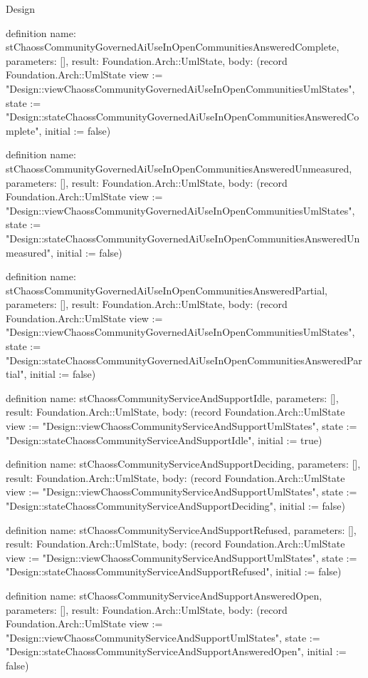 \begin{lexlean}{Design}
\begin{semanticmodule}
definition{
  name: stChaossCommunityGovernedAiUseInOpenCommunitiesAnsweredComplete,
  parameters: [],
  result: Foundation.Arch::UmlState,
  body: (record Foundation.Arch::UmlState {view := "Design::viewChaossCommunityGovernedAiUseInOpenCommunitiesUmlStates", state := "Design::stateChaossCommunityGovernedAiUseInOpenCommunitiesAnsweredComplete", initial := false})
}

definition{
  name: stChaossCommunityGovernedAiUseInOpenCommunitiesAnsweredUnmeasured,
  parameters: [],
  result: Foundation.Arch::UmlState,
  body: (record Foundation.Arch::UmlState {view := "Design::viewChaossCommunityGovernedAiUseInOpenCommunitiesUmlStates", state := "Design::stateChaossCommunityGovernedAiUseInOpenCommunitiesAnsweredUnmeasured", initial := false})
}

definition{
  name: stChaossCommunityGovernedAiUseInOpenCommunitiesAnsweredPartial,
  parameters: [],
  result: Foundation.Arch::UmlState,
  body: (record Foundation.Arch::UmlState {view := "Design::viewChaossCommunityGovernedAiUseInOpenCommunitiesUmlStates", state := "Design::stateChaossCommunityGovernedAiUseInOpenCommunitiesAnsweredPartial", initial := false})
}

definition{
  name: stChaossCommunityServiceAndSupportIdle,
  parameters: [],
  result: Foundation.Arch::UmlState,
  body: (record Foundation.Arch::UmlState {view := "Design::viewChaossCommunityServiceAndSupportUmlStates", state := "Design::stateChaossCommunityServiceAndSupportIdle", initial := true})
}

definition{
  name: stChaossCommunityServiceAndSupportDeciding,
  parameters: [],
  result: Foundation.Arch::UmlState,
  body: (record Foundation.Arch::UmlState {view := "Design::viewChaossCommunityServiceAndSupportUmlStates", state := "Design::stateChaossCommunityServiceAndSupportDeciding", initial := false})
}

definition{
  name: stChaossCommunityServiceAndSupportRefused,
  parameters: [],
  result: Foundation.Arch::UmlState,
  body: (record Foundation.Arch::UmlState {view := "Design::viewChaossCommunityServiceAndSupportUmlStates", state := "Design::stateChaossCommunityServiceAndSupportRefused", initial := false})
}

definition{
  name: stChaossCommunityServiceAndSupportAnsweredOpen,
  parameters: [],
  result: Foundation.Arch::UmlState,
  body: (record Foundation.Arch::UmlState {view := "Design::viewChaossCommunityServiceAndSupportUmlStates", state := "Design::stateChaossCommunityServiceAndSupportAnsweredOpen", initial := false})
}


\end{semanticmodule}
\end{lexlean}
